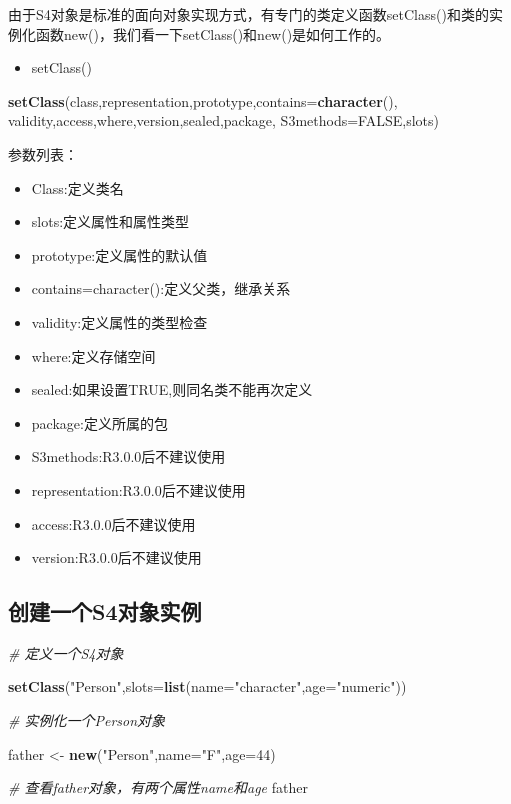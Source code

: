 \documentclass[]{book}
\newenvironment{Shaded}{\begin{snugshade}}{\end{snugshade}}
\newcommand{\KeywordTok}[1]{\textcolor[rgb]{0.13,0.29,0.53}{\textbf{#1}}}
\newcommand{\DataTypeTok}[1]{\textcolor[rgb]{0.13,0.29,0.53}{#1}}
\newcommand{\DecValTok}[1]{\textcolor[rgb]{0.00,0.00,0.81}{#1}}
\newcommand{\StringTok}[1]{\textcolor[rgb]{0.31,0.60,0.02}{#1}}
\newcommand{\CommentTok}[1]{\textcolor[rgb]{0.56,0.35,0.01}{\textit{#1}}}
\newcommand{\OtherTok}[1]{\textcolor[rgb]{0.56,0.35,0.01}{#1}}
\newcommand{\NormalTok}[1]{#1}
\providecommand{\tightlist}{%
  \setlength{\itemsep}{0pt}\setlength{\parskip}{0pt}}
\begin{document}
由于S4对象是标准的面向对象实现方式，有专门的类定义函数setClass()和类的实例化函数new()，我们看一下setClass()和new()是如何工作的。

\begin{itemize}
\tightlist
\item
  setClass()
\end{itemize}

\begin{Shaded}
\begin{Highlighting}[]
\KeywordTok{setClass}\NormalTok{(class,representation,prototype,}\DataTypeTok{contains=}\KeywordTok{character}\NormalTok{(),}
\NormalTok{  validity,access,where,version,sealed,package,}
  \DataTypeTok{S3methods=}\OtherTok{FALSE}\NormalTok{,slots)}
\end{Highlighting}
\end{Shaded}

参数列表：

\begin{itemize}
\item
  Class:定义类名
\item
  slots:定义属性和属性类型
\item
  prototype:定义属性的默认值
\item
  contains=character():定义父类，继承关系
\item
  validity:定义属性的类型检查
\item
  where:定义存储空间
\item
  sealed:如果设置TRUE,则同名类不能再次定义
\item
  package:定义所属的包
\item
  S3methods:R3.0.0后不建议使用
\item
  representation:R3.0.0后不建议使用
\item
  access:R3.0.0后不建议使用
\item
  version:R3.0.0后不建议使用
\end{itemize}

\subsection{创建一个S4对象实例}\label{s4}

\begin{Shaded}
\begin{Highlighting}[]
\CommentTok{# 定义一个S4对象}

\KeywordTok{setClass}\NormalTok{(}\StringTok{"Person"}\NormalTok{,}\DataTypeTok{slots=}\KeywordTok{list}\NormalTok{(}\DataTypeTok{name=}\StringTok{"character"}\NormalTok{,}\DataTypeTok{age=}\StringTok{"numeric"}\NormalTok{))}

\CommentTok{# 实例化一个Person对象}

\NormalTok{father <-}\StringTok{ }\KeywordTok{new}\NormalTok{(}\StringTok{"Person"}\NormalTok{,}\DataTypeTok{name=}\StringTok{"F"}\NormalTok{,}\DataTypeTok{age=}\DecValTok{44}\NormalTok{)}

\CommentTok{# 查看father对象，有两个属性name和age}
\NormalTok{father}
\end{Highlighting}
\end{Shaded}
\end{document}
